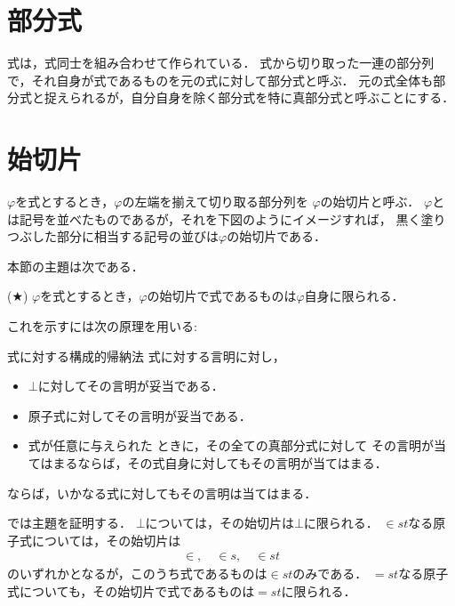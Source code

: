 \documentclass[a4j,10.5pt,oneside,openany]{jsbook}
\theoremstyle{mystyle}
\begin{document}
\section{部分式}
	式は，式同士を組み合わせて作られている．
	式から切り取った一連の部分列で，それ自身が式であるものを元の式に対して部分式と呼ぶ．
	元の式全体も部分式と捉えられるが，自分自身を除く部分式を特に真部分式と呼ぶことにする．
	
\section{始切片}
	$\varphi$を式とするとき，$\varphi$の左端を揃えて切り取る部分列を
	$\varphi$の始切片と呼ぶ．
	$\varphi$とは記号を並べたものであるが，それを下図のようにイメージすれば，
	黒く塗りつぶした部分に相当する記号の並びは$\varphi$の始切片である．
	
	\begin{center}
	\end{center}
	
	本節の主題は次である．
	\begin{screen}
		(★) $\varphi$を式とするとき，$\varphi$の始切片で式であるものは$\varphi$自身に限られる．
	\end{screen}
	
	これを示すには次の原理を用いる:
	\begin{itembox}[l]{式に対する構成的帰納法}
		式に対する言明に対し，
		\begin{itemize}
			\item $\bot$に対してその言明が妥当である．
			\item 原子式に対してその言明が妥当である．
			\item 式が任意に与えられた\footnotemark
				ときに，その全ての真部分式に対して
				その言明が当てはまるならば，その式自身に対してもその言明が当てはまる．
		\end{itemize}
		ならば，いかなる式に対してもその言明は当てはまる．
	\end{itembox}
	
	
	では主題を証明する．
	$\bot$については，その始切片は$\bot$に限られる．
	$\in st$なる原子式については，その始切片は
	\begin{align}
		\in, \quad \in s, \quad \in st
	\end{align}
	のいずれかとなるが，このうち式であるものは$\in st$のみである．
	$=st$なる原子式についても，その始切片で式であるものは$=st$に限られる．
	
\end{document}
